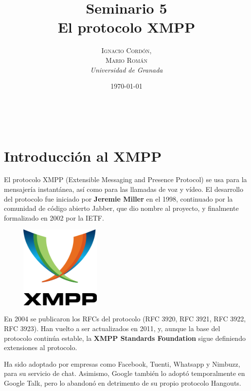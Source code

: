 \documentclass[a4paper, 11pt]{article} %
\title{\textbf{Seminario 5}\\ %
El protocolo XMPP} %
\author{\textsc{Ignacio Cordón,\\Mario Román} %
\\{\textit{Universidad de Granada}}} %
\date{\today} %
\makeatletter
\renewcommand{\maketitle}{ %
\begin{flushright} %
    {\LARGE\@title} %
    
    \vspace{50pt} %
    
    {\large\@author} %
    \\\@date %
    
    \vspace{40pt} %
\end{flushright}
}
\makeatother
\begin{document}
\maketitle %



\renewcommand{\abstractname}{Resumen} %
\begin{abstract}
\end{abstract}
{\parskip=2pt
\tableofcontents
}
\pagebreak



\section{Introducción al XMPP}
  El protocolo XMPP (Extensible Messaging and Presence Protocol) se usa para la mensajería
  instantánea, así como para las llamadas de voz y vídeo. El desarrollo del protocolo fue
  iniciado por \textbf{Jeremie Miller} en el 1998, continuado por la comunidad de código abierto Jabber, que dio
  nombre al proyecto, y finalmente formalizado en 2002 por la IETF.\\
  \begin{figure}
  \includegraphics[width=4cm]{logo.png}
  \end{figure}
  En 2004 se publicaron los RFCs del protocolo (RFC 3920, RFC 3921, RFC 3922, RFC 3923). Han vuelto a ser actualizados en 2011, y, aunque
  la base del protocolo continúa estable, la \textbf{XMPP Standards Foundation} sigue definiendo extensiones
  al protocolo.
  
  Ha sido adoptado por empresas como Facebook, Tuenti, Whatsapp y Nimbuzz, para su servicio de chat. Asimismo, Google
  también lo adoptó temporalmente en Google Talk, pero lo abandonó en detrimento de su propio protocolo Hangouts.
\end{document}
